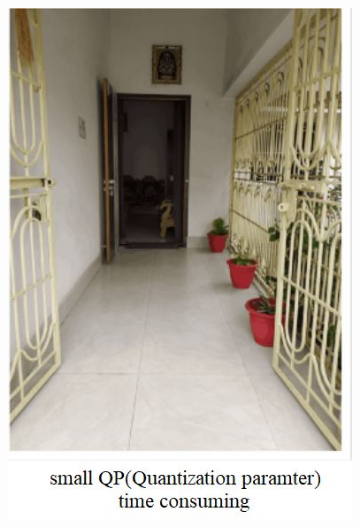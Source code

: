 \documentclass[a4]{article}
\begin{document}
\begin{figure}[H]
\begin{subfigure}{.3\textwidth}
		\includegraphics[width=.9\linewidth]{q1_2}
	\end{subfigure}
	\begin{subfigure}{.3\textwidth}
		\centering

\end{subfigure}
\end{figure}
\end{document}

